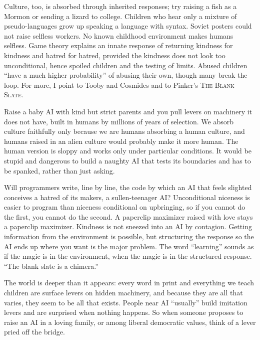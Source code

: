 Culture, too, is absorbed through inherited responses; try raising a fish as a Mormon or sending a lizard to college. Children who hear only a mixture of pseudo-languages grow up speaking a language with syntax.  Soviet posters could not raise selfless workers. No known childhood environment makes humans selfless. Game theory explains an innate response of returning kindness for kindness and hatred for hatred, provided the kindness does not look too unconditional, hence spoiled children and the testing of limits. Abused children ``have a much higher probability'' of abusing their own, though many break the loop. For more, I point to Tooby and Cosmides and to Pinker's \textsc{The Blank Slate}. 

Raise a baby AI with kind but strict parents and you pull levers on machinery it does not have, built in humans by millions of years of selection. We absorb culture faithfully only because we are humans absorbing a human culture, and humans raised in an alien culture would probably make it more human. The human version is sloppy and works only under particular conditions. It would be stupid and dangerous to build a naughty AI that tests its boundaries and has to be spanked, rather than just asking.

Will programmers write, line by line, the code by which an AI that feels slighted conceives a hatred of its makers, a sullen-teenager AI? Unconditional niceness is easier to program than niceness conditional on upbringing, so if you cannot do the first, you cannot do the second. A paperclip maximizer raised with love stays a paperclip maximizer. Kindness is not sneezed into an AI by contagion. Getting information from the environment is possible, but structuring the response so the AI ends up where you want is the major problem. The word ``learning'' sounds as if the magic is in the environment, when the magic is in the structured response. ``The blank slate is a chimera.'' 

The world is deeper than it appears: every word in print and everything we teach children are surface levers on hidden machinery, and because they are all that varies, they seem to be all that exists. People near AI ``usually'' build imitation levers and are surprised when nothing happens.  So when someone proposes to raise an AI in a loving family, or among liberal democratic values, think of a lever pried off the bridge.
